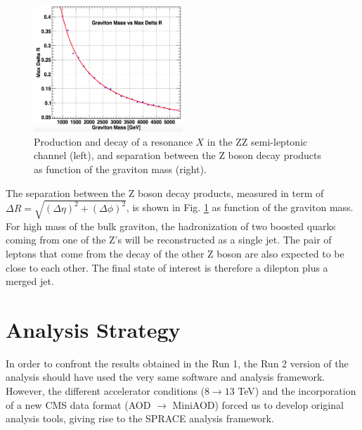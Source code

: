 \begin{figure}[htb!]
\begin{center}
\includegraphics[width=0.50\textwidth]{figures/objects/deltaRvsMass.png}
\caption[Production and decay channel]{Production and decay of a resonance $X$ in the ZZ semi-leptonic channel (left), and separation between the Z boson decay products as function of the graviton mass (right).}
\label{VZchannel}
\end{center}
\end{figure}

The separation between the Z boson decay products, measured in term of $\Delta R = \sqrt{(\Delta\eta)^2 + (\Delta\phi)^2}$, is shown in Fig. \ref{VZchannel} as function of the graviton mass. For high mass of the bulk graviton, the hadronization of two boosted quarks coming from one of the Z's will be reconstructed as a single jet. The pair of leptons that come from the decay of the other Z boson are also expected to be close to each other. The final state of interest is therefore a dilepton plus a merged jet.

\clearpage
\section{Analysis Strategy}

In order to confront the results obtained in the Run 1, the Run 2 version of the analysis should have used the very same software and analysis framework. However, the different accelerator conditions ($8 \rightarrow 13$ TeV) and the incorporation of a new CMS data format (AOD $\rightarrow$ MiniAOD) forced us to develop original analysis tools, giving rise to the SPRACE analysis framework.%

